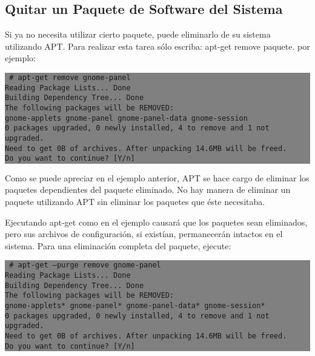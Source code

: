 \documentclass[12pt]{article}
\begin{document}
\subsection*{Quitar un Paquete de Software del Sistema}

Si ya no necesita utilizar cierto paquete, puede eliminarlo de su sistema utilizando APT. Para realizar esta tarea sólo escriba: apt-get remove paquete. por ejemplo:

\colorbox{grey}{\parbox[t]{0.95\linewidth}{ \vspace*{0.5cm} {\tt
     \# apt-get remove gnome-panel\\
     Reading Package Lists... Done\\
     Building Dependency Tree... Done\\
     The following packages will be REMOVED:\\
       gnome-applets gnome-panel gnome-panel-data gnome-session\\
     0 packages upgraded, 0 newly installed, 4 to remove and 1 not upgraded.\\
     Need to get 0B of archives. After unpacking 14.6MB will be freed.\\
     Do you want to continue? [Y/n]\\
 } \vspace*{0.5cm} } } 

Como se puede apreciar en el ejemplo anterior, APT se hace cargo de eliminar los paquetes dependientes del paquete eliminado. No hay manera de eliminar un paquete utilizando APT sin eliminar los paquetes que éste necesitaba.

Ejecutando apt-get como en el ejemplo causará que los paquetes sean eliminados, pero sus archivos de configuración, si existían, permanecerán intactos en el sistema. Para una eliminación completa del paquete, ejecute:

\colorbox{grey}{\parbox[t]{0.95\linewidth}{ \vspace*{0.5cm} {\tt
     \# apt-get --purge remove gnome-panel\\
     Reading Package Lists... Done\\
     Building Dependency Tree... Done\\
     The following packages will be REMOVED:\\
       gnome-applets* gnome-panel* gnome-panel-data* gnome-session*\\
     0 packages upgraded, 0 newly installed, 4 to remove and 1 not upgraded.\\
     Need to get 0B of archives. After unpacking 14.6MB will be freed.\\
     Do you want to continue? [Y/n]\\
 } \vspace*{0.5cm} } } 
\end{document}
